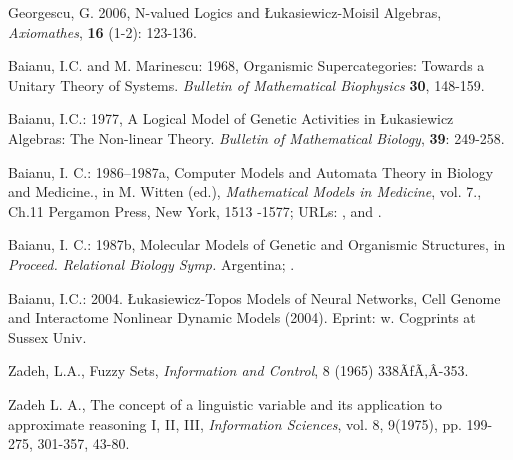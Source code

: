 \documentclass[12pt]{article}
\theoremstyle{plain}
\theoremstyle{definition}
\numberwithin{equation}{section}
\begin{document}
\begin{thebibliography}{99}

Georgescu, G. 2006, N-valued Logics and \L ukasiewicz-Moisil
Algebras, \emph{Axiomathes}, \textbf{16} (1-2): 123-136.

Baianu, I.C. and M. Marinescu: 1968, Organismic Supercategories:
Towards a Unitary Theory of Systems. \emph{Bulletin of Mathematical Biophysics} \textbf{30}, 148-159.

Baianu, I.C.: 1977, A Logical Model of Genetic Activities in \L ukasiewicz Algebras: The Non-linear Theory. \emph{Bulletin of Mathematical Biology}, \textbf{39}: 249-258.
    
Baianu, I. C.: 1986--1987a, Computer Models and Automata Theory in Biology and Medicine., in M. Witten (ed.),
\emph{Mathematical Models in Medicine}, vol. 7., Ch.11 Pergamon Press, New York, 1513 -1577; URLs:
 ,
and .

Baianu, I. C.: 1987b, Molecular Models of Genetic and Organismic Structures, in \emph{Proceed. Relational Biology Symp.}
Argentina;
 .

Baianu, I.C.: 2004. \L{}ukasiewicz-Topos Models of Neural Networks, Cell Genome and Interactome Nonlinear Dynamic Models (2004). Eprint: w. Cogprints at Sussex Univ. 

Zadeh, L.A., Fuzzy Sets, {\em Information and Control}, 8 (1965) 338ÃƒÃ‚Â­-353.

Zadeh L. A., The concept of a linguistic variable and its application to approximate reasoning I, II, III, {\em Information Sciences}, vol. 8, 9(1975), pp. 199-275, 301-357, 43-80.

\end{thebibliography}
\end{document}
